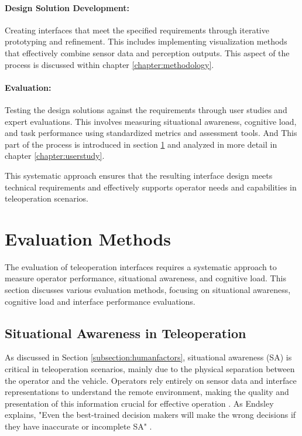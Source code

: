 \paragraph{Design Solution Development:} Creating interfaces that meet the specified requirements through iterative prototyping and refinement. This includes implementing visualization methods that effectively combine sensor data and perception outputs.
This aspect of the process is discussed within chapter \ref{chapter:methodology}.
\paragraph{Evaluation:} Testing the design solutions against the requirements through user studies and expert evaluations. This involves measuring situational awareness, cognitive load, and task performance using standardized metrics and assessment tools. And This part of the process is introduced in section \ref{section:evaluationmethods} and analyzed in more detail in chapter \ref{chapter:userstudy}.

This systematic approach ensures that the resulting interface design meets technical requirements and effectively supports operator needs and capabilities in teleoperation scenarios.


\section{Evaluation Methods}\label{section:evaluationmethods}
The evaluation of teleoperation interfaces requires a systematic approach to measure operator performance, situational awareness, and cognitive load. This section discusses various evaluation methods, focusing on situational awareness, cognitive load and interface performance evaluations.
\subsection{Situational Awareness in Teleoperation}
As discussed in Section \ref{subsection:humanfactors}, situational awareness (SA) is critical in teleoperation scenarios, mainly due to the physical separation between the operator and the vehicle. Operators rely entirely on sensor data and interface representations to understand the remote environment, making the quality and presentation of this information crucial for effective operation \cite{Gnatzig}. As Endsley explains, "Even the best-trained decision makers will make the wrong decisions if they have inaccurate or incomplete SA" \cite{endsley1995toward}.

